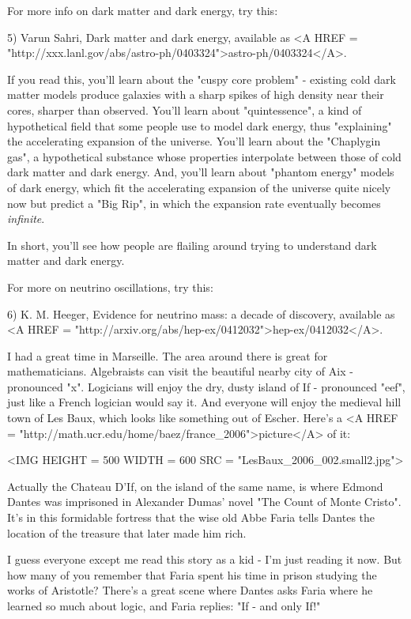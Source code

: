 For more info on dark matter and dark energy, try this:

5) Varun Sahri, Dark matter and dark energy, available as <A HREF = "http://xxx.lanl.gov/abs/astro-ph/0403324">astro-ph/0403324</A>.

If you read this, you'll learn about the "cuspy core problem" - 
existing
cold dark matter models produce galaxies with a sharp spikes of high
density near their cores, sharper than observed.  You'll learn about
"quintessence", a kind of hypothetical field that some people use to 
model dark energy, thus "explaining" the accelerating expansion 
of the universe.  You'll learn about the "Chaplygin gas", a 
hypothetical substance 
whose properties interpolate between those of cold dark matter and dark
energy.  And, you'll learn about "phantom energy" models of dark 
energy, 
which fit the accelerating expansion of the universe quite nicely now 
but predict a "Big Rip", in which the expansion rate eventually 
becomes 
\emph{infinite}. 

In short, you'll see how people are flailing around trying to understand 
dark matter and dark energy.

For more on neutrino oscillations, try this:

6) K. M. Heeger, Evidence for neutrino mass: a decade of discovery,
available as <A HREF = "http://arxiv.org/abs/hep-ex/0412032">hep-ex/0412032</A>.

I had a great time in Marseille.  The area around there is great for 
mathematicians.  Algebraists can visit the beautiful nearby city of 
Aix - pronounced "x".  Logicians will enjoy the dry, dusty island of 
If - pronounced "eef", just like a French logician would say it.  
And everyone will enjoy the medieval hill town of Les Baux, which looks 
like something out of Escher.  Here's a <A HREF = "http://math.ucr.edu/home/baez/france_2006">picture</A> of it:

<IMG HEIGHT = 500 WIDTH = 600 SRC = "LesBaux_2006_002.small2.jpg">

Actually the Chateau D'If, on the island of the same name, is where 
Edmond Dantes was imprisoned in Alexander Dumas' novel "The Count of 
Monte Cristo".  It's in this formidable fortress that the wise old 
Abbe Faria tells Dantes the location of the treasure that later made 
him rich.  

I guess everyone except me read this story as a kid - I'm just reading
it now.  But how many of you remember that Faria spent his time in 
prison studying the works of Aristotle?  There's a great scene where 
Dantes asks Faria where he learned so much about logic, and Faria replies: 
"If - and only If!"

